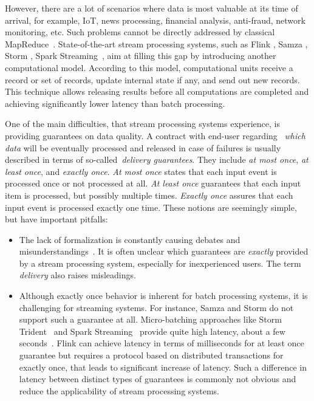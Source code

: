 However, there are a lot of scenarios where data is most valuable at its time of arrival, for example, IoT, news processing, financial analysis, anti-fraud, network monitoring, etc. Such problems cannot be directly addressed by classical MapReduce~\cite{Doulkeridis:2014:SLA:2628707.2628782}. State-of-the-art stream processing systems, such as Flink \cite{carbone2015apache}, Samza \cite{Noghabi:2017:SSS:3137765.3137770}, Storm \cite{apache:storm}, Spark Streaming~\cite{Zaharia:2012:DSE:2342763.2342773}, aim at filling this gap by introducing another computational model. According to this model, computational units receive a record or set of records, update internal state if any, and send out new records. This technique allows releasing results before all computations are completed and achieving significantly lower latency than batch processing. 

One of the main difficulties, that stream processing systems experience, is providing guarantees on data quality. A contract with end-user regarding ~{\em which data} will be eventually processed and released in case of failures is usually described in terms of so-called~{\em delivery guarantees}. They include {\em at most once}, {\em at least once}, and {\em exactly once}. {\it At most once} states that each input event is processed once or not processed at all. {\it At least once} guarantees that each input item is processed, but possibly multiple times. {\it Exactly once} assures that each input event is processed exactly one time. These notions are seemingly simple, but have important pitfalls:

\begin{itemize}
    \item The lack of formalization is constantly causing debates and misunderstandings~\cite{JerryPengStreamIO, PaperTrail}. It is often unclear which guarantees are {\em exactly} provided by a stream processing system, especially for inexperienced users. The term {\em delivery} also raises misleadings.  
    \item Although exactly once behavior is inherent for batch processing systems, it is challenging for streaming systems. For instance, Samza and Storm do not support such a guarantee at all. Micro-batching approaches like Storm Trident~\cite{apache:storm:trident} and Spark Streaming~\cite{Zaharia:2012:DSE:2342763.2342773} provide quite high latency, about a few seconds~\cite{7530084, 7474816}. Flink can achieve latency in terms of milliseconds for at least once guarantee but requires a protocol based on distributed transactions for exactly once, that leads to significant increase of latency. Such a difference in latency between distinct types of guarantees is commonly not obvious and reduce the applicability of stream processing systems.
\end{itemize}


